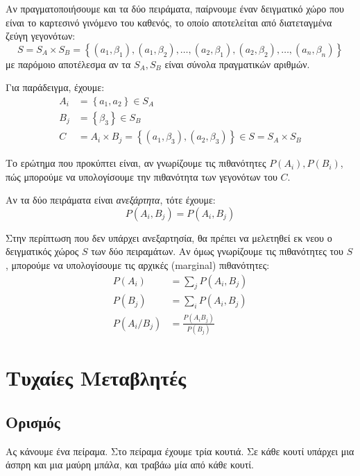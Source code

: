 \documentclass[11pt,a4paper,notitlepage,fleqn,draft]{article}
\begin{document}
	Αν πραγματοποιήσουμε και τα δύο πειράματα, παίρνουμε έναν δειγματικό
	χώρο που είναι το καρτεσινό γινόμενο του καθενός, το οποίο
	αποτελείται από διατεταγμένα ζεύγη γεγονότων:
	\[
	S = S_A \times S_B = \left\lbrace 
	(a_1,\beta_1),(a_1,\beta_2),\dots,(a_2,\beta_1),(a_2,\beta_2),\dots,
	(a_n,\beta_n)
	 \right\rbrace
	\]
	με παρόμοιο αποτέλεσμα αν τα \( S_A,S_B \) είναι σύνολα πραγματικών
	αριθμών.
	
	Για παράδειγμα, έχουμε:
	\begin{align*}
		A_i &= \left\lbrace a_1,a_2 \right\rbrace \in S_A \\
		B_j &= \left\lbrace \beta_3 \right\rbrace \in S_B \\
		C &= A_i \times B_j = \left\lbrace
		(a_1,\beta_3),(a_2,\beta_3) \right\rbrace \in S = S_A \times S_B
	\end{align*}
	
	Το ερώτημα που προκύπτει είναι, αν γνωρίζουμε τις πιθανότητες
	\( P(A_i), P(B_i) \), πώς μπορούμε να υπολογίσουμε την πιθανότητα
	των γεγονότων του \( C \).
	
	Αν τα δύο πειράματα είναι \textit{ανεξάρτητα}, τότε έχουμε:
	\[
	P(A_i,B_j) = P(A_i, B_j)
	\]
	
	Στην περίπτωση που δεν υπάρχει ανεξαρτησία, θα πρέπει να μελετηθεί
	εκ νεου ο δειγματικός χώρος \( S \) των δύο πειραμάτων. Αν όμως
	γνωρίζουμε τις πιθανότητες του \( S \), μπορούμε να υπολογίσουμε
	τις αρχικές (marginal) πιθανότητες:
	\begin{align*}
		P(A_i) &= \sum_j P(A_i, B_j) \\
		P(B_j) &= \sum_i P(A_i, B_j) \\
		P(A_i/B_j) &= \frac{P(A_iB_j)}{P(B_j)}
	\end{align*}
	
	\section{Τυχαίες Μεταβλητές}
	\subsection{Ορισμός}
	Ας κάνουμε ένα πείραμα. Στο πείραμα έχουμε τρία κουτιά. Σε κάθε
	κουτί υπάρχει μια άσπρη και μια μαύρη μπάλα, και τραβάω μία από
	κάθε κουτί.
	
\end{document}
